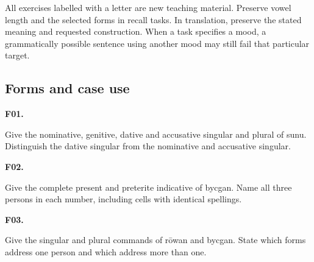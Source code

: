 All exercises labelled with a letter are new teaching material. Preserve vowel length and the selected forms in recall tasks. In translation, preserve the stated meaning and requested construction. When a task specifies a mood, a grammatically possible sentence using another mood may still fail that particular target.

\subsection*{Forms and case use}

\par\begin{minipage}{\linewidth}\raggedright
\textbf{F01.}

Give the nominative, genitive, dative and accusative singular and plural of sunu. Distinguish the dative singular from the nominative and accusative singular.

\end{minipage}\par\addvspace{4pt}

\par\begin{minipage}{\linewidth}\raggedright
\textbf{F02.}

Give the complete present and preterite indicative of bycgan. Name all three persons in each number, including cells with identical spellings.

\end{minipage}\par\addvspace{4pt}

\par\begin{minipage}{\linewidth}\raggedright
\textbf{F03.}

Give the singular and plural commands of rōwan and bycgan. State which forms address one person and which address more than one.

\end{minipage}\par\addvspace{4pt}

